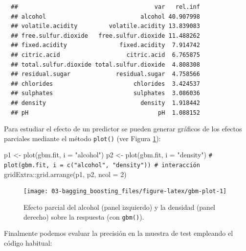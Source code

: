 \documentclass[
]{book}
\newenvironment{Shaded}{\begin{snugshade}}{\end{snugshade}}
\newcommand{\AttributeTok}[1]{\textcolor[rgb]{0.77,0.63,0.00}{#1}}
\newcommand{\CommentTok}[1]{\textcolor[rgb]{0.56,0.35,0.01}{\textit{#1}}}
\newcommand{\DecValTok}[1]{\textcolor[rgb]{0.00,0.00,0.81}{#1}}
\newcommand{\FunctionTok}[1]{\textcolor[rgb]{0.00,0.00,0.00}{#1}}
\newcommand{\NormalTok}[1]{#1}
\newcommand{\OtherTok}[1]{\textcolor[rgb]{0.56,0.35,0.01}{#1}}
\newcommand{\SpecialCharTok}[1]{\textcolor[rgb]{0.00,0.00,0.00}{#1}}
\newcommand{\StringTok}[1]{\textcolor[rgb]{0.31,0.60,0.02}{#1}}
\theoremstyle{break}
\theoremstyle{nonumberplain}
\renewcommand{\CommentTok}[1]{\textcolor[rgb]{0.41,0.41,0.41}{\texttt{#1}}}
\begin{document}
\begin{verbatim}
  ##                                       var   rel.inf
  ## alcohol                           alcohol 40.907998
  ## volatile.acidity         volatile.acidity 13.839083
  ## free.sulfur.dioxide   free.sulfur.dioxide 11.488262
  ## fixed.acidity               fixed.acidity  7.914742
  ## citric.acid                   citric.acid  6.765875
  ## total.sulfur.dioxide total.sulfur.dioxide  4.808308
  ## residual.sugar             residual.sugar  4.758566
  ## chlorides                       chlorides  3.424537
  ## sulphates                       sulphates  3.086036
  ## density                           density  1.918442
  ## pH                                     pH  1.088152
\end{verbatim}

Para estudiar el efecto de un predictor se pueden generar gráficos de los efectos parciales mediante el método \texttt{plot()} (ver Figura \ref{fig:gbm-plot}):



\begin{Shaded}
\begin{Highlighting}[]
\NormalTok{p1 }\OtherTok{\textless{}{-}} \FunctionTok{plot}\NormalTok{(gbm.fit, }\AttributeTok{i =} \StringTok{"alcohol"}\NormalTok{)}
\NormalTok{p2 }\OtherTok{\textless{}{-}} \FunctionTok{plot}\NormalTok{(gbm.fit, }\AttributeTok{i =} \StringTok{"density"}\NormalTok{)}
\CommentTok{\# plot(gbm.fit, i = c("alcohol", "density")) \# interacción}
\NormalTok{gridExtra}\SpecialCharTok{::}\FunctionTok{grid.arrange}\NormalTok{(p1, p2, }\AttributeTok{ncol =} \DecValTok{2}\NormalTok{)}
\end{Highlighting}
\end{Shaded}

\begin{figure}[!htb]

{\centering \texttt{[image: 03-bagging\_boosting\_files/figure-latex/gbm-plot-1]} 

}

\caption{Efecto parcial del alcohol (panel izquierdo) y la densidad (panel derecho) sobre la respuesta (con \texttt{gbm()}).}\label{fig:gbm-plot}
\end{figure}

Finalmente podemos evaluar la precisión en la muestra de test empleando el código habitual:

\begin{Shaded}
\end{Shaded}
\end{document}
